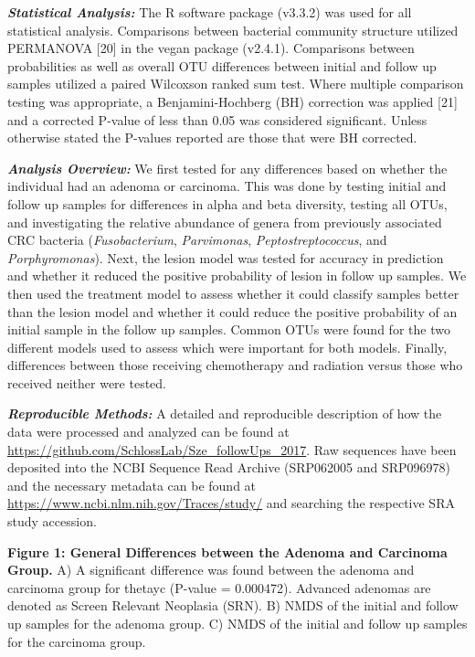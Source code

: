 \documentclass[12pt,]{article}
\begin{document}
\textbf{\emph{Statistical Analysis:}} The R software package (v3.3.2)
was used for all statistical analysis. Comparisons between bacterial
community structure utilized PERMANOVA {[}20{]} in the vegan package
(v2.4.1). Comparisons between probabilities as well as overall OTU
differences between initial and follow up samples utilized a paired
Wilcoxson ranked sum test. Where multiple comparison testing was
appropriate, a Benjamini-Hochberg (BH) correction was applied {[}21{]}
and a corrected P-value of less than 0.05 was considered significant.
Unless otherwise stated the P-values reported are those that were BH
corrected.

\textbf{\emph{Analysis Overview:}} We first tested for any differences
based on whether the individual had an adenoma or carcinoma. This was
done by testing initial and follow up samples for differences in alpha
and beta diversity, testing all OTUs, and investigating the relative
abundance of genera from previously associated CRC bacteria
(\emph{Fusobacterium}, \emph{Parvimonas}, \emph{Peptostreptococcus}, and
\emph{Porphyromonas}). Next, the lesion model was tested for accuracy in
prediction and whether it reduced the positive probability of lesion in
follow up samples. We then used the treatment model to assess whether it
could classify samples better than the lesion model and whether it could
reduce the positive probability of an initial sample in the follow up
samples. Common OTUs were found for the two different models used to
assess which were important for both models. Finally, differences
between those receiving chemotherapy and radiation versus those who
received neither were tested.

\textbf{\emph{Reproducible Methods:}} A detailed and reproducible
description of how the data were processed and analyzed can be found at
\url{https://github.com/SchlossLab/Sze_followUps_2017}. Raw sequences
have been deposited into the NCBI Sequence Read Archive (SRP062005 and
SRP096978) and the necessary metadata can be found at
\url{https://www.ncbi.nlm.nih.gov/Traces/study/} and searching the
respective SRA study accession.

\newpage

\textbf{Figure 1: General Differences between the Adenoma and Carcinoma
Group.} A) A significant difference was found between the adenoma and
carcinoma group for thetayc (P-value = 0.000472). Advanced adenomas are
denoted as Screen Relevant Neoplasia (SRN). B) NMDS of the initial and
follow up samples for the adenoma group. C) NMDS of the initial and
follow up samples for the carcinoma group.
\end{document}
